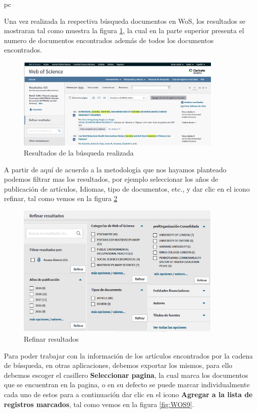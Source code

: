pc\documentclass[a4paper,12pt,openany]{book}
\begin{document}
\begin{itemize}
Una vez realizada la respectiva búsqueda documentos en WoS, los resultados se mostraran tal como muestra la figura \ref{fig:WOS7}, la cual en la parte superior presenta el numero de documentos encontrados además de todos los documentos encontrados. 

        \begin{figure}[H]
        \centering
    	\includegraphics[width=10cm]{Wos7.png}
        \caption{Resultados de la búsqueda realizada}
        \label{fig:WOS7}
        \end{figure}

A partir de aquí de acuerdo a la metodología que nos hayamos planteado podemos filtrar mas los resultados, por ejemplo seleccionar los años de publicación de artículos, Idiomas, tipo de documentos, etc., y dar clic en el icono refinar, tal como vemos en la figura \ref{fig:WOS8}  


    \begin{figure}[H]
    \centering
	\includegraphics[width=10cm]{Wos8.png}
    \caption{Refinar resultados}
    \label{fig:WOS8}
    \end{figure}

Para poder trabajar con la información de los artículos encontrados por la cadena de búsqueda, en otras aplicaciones, debemos exportar los mismos, para ello debemos escoger el casillero \textbf{Seleccionar pagina}, la cual marca los documentos que se encuentran en la pagina, o en su defecto se puede marcar individualmente cada uno de estos para a continuación dar clic en el icono \textbf{Agregar a la lista de registros marcados}, tal como vemos en la figura \ref{fig:WOS9}.   


\end{itemize}
\end{document}
